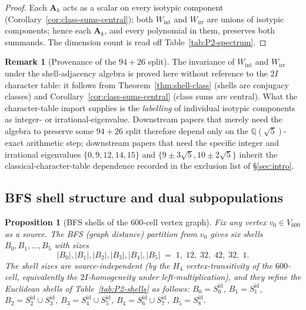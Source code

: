\documentclass[11pt, a4paper]{amsart}
\newtheorem{proposition}[theorem]{Proposition}
\theoremstyle{definition}
\newtheorem{remark}[theorem]{Remark}
\newcommand{\Q}{\mathbb{Q}}
\begin{document}
\begin{proof}
Each $\mathbf{A}_k$ acts as a scalar on every isotypic component
(Corollary~\ref{cor:class-sums-central}); both $W_{\mathrm{int}}$
and $W_{\mathrm{irr}}$ are unions of isotypic components; hence
each $\mathbf{A}_k$, and every polynomial in them, preserves both
summands. The dimension count is read off
Table~\ref{tab:P2-spectrum}.
\end{proof}

\begin{remark}[Provenance of the $94{+}26$ split]
The invariance of $W_{\mathrm{int}}$ and $W_{\mathrm{irr}}$ under
the shell-adjacency algebra is proved here without reference to
the $2I$ character table: it follows from
Theorem~\ref{thm:shell-class} (shells are conjugacy classes) and
Corollary~\ref{cor:class-sums-central} (class sums are central).
What the character-table import supplies is the \emph{labelling}
of individual isotypic components as integer- or
irrational-eigenvalue. Downstream papers that merely need the
algebra to preserve some $94{+}26$ split therefore depend only on
the $\Q(\sqrt 5)$-exact arithmetic step; downstream papers that
need the specific integer and irrational eigenvalues $\{0, 9, 12,
14, 15\}$ and $\{9 \pm 3\sqrt 5, 10 \pm 2\sqrt 5\}$ inherit the
classical-character-table dependence recorded in the exclusion
list of \S\ref{sec:intro}.
\end{remark}

\subsection{BFS shell structure and dual subpopulations}
\label{sec:BFS-P2}

\begin{proposition}[BFS shells of the $600$-cell vertex graph]
\label{prop:BFS-shells}
Fix any vertex $v_0 \in V_{600}$ as a source. The BFS (graph
distance) partition from $v_0$ gives six shells
$B_0, B_1, \ldots, B_5$ with sizes
\[
  |B_0|, |B_1|, |B_2|, |B_3|, |B_4|, |B_5|
  \;=\; 1,\;12,\;32,\;42,\;32,\;1.
\]
The shell sizes are source-independent (by the $H_4$
vertex-transitivity of the $600$-cell, equivalently the
$2I$-homogeneity under left-multiplication), and they refine the
Euclidean shells of Table~\ref{tab:P2-shells} as follows: $B_0 =
S_0^{\mathrm{id}}$, $B_1 = S_1^{\mathrm{id}}$, $B_2 =
S_2^{\mathrm{id}} \cup S_3^{\mathrm{id}}$, $B_3 = S_4^{\mathrm{id}}
\cup S_5^{\mathrm{id}}$, $B_4 = S_6^{\mathrm{id}} \cup
S_7^{\mathrm{id}}$, $B_5 = S_8^{\mathrm{id}}$.
\end{proposition}
\end{document}
